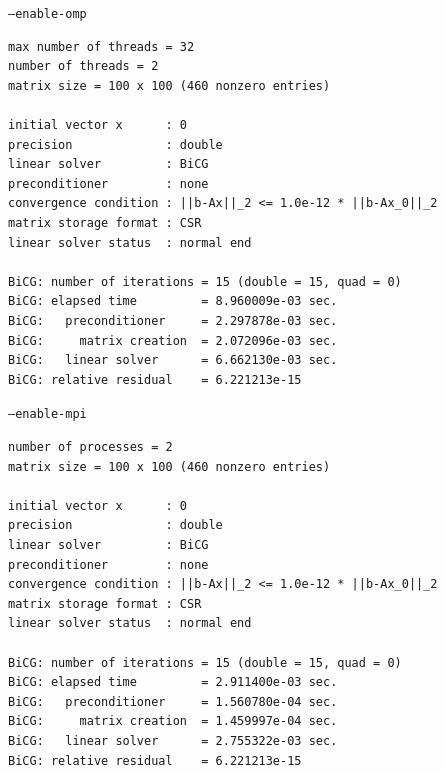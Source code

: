 \documentclass[a4paper]{jarticle}
\begin{document}
{{{{\begin{itembox}[l]
{\begin{minipage}{10cm}
\begin{verbatim}
initial vector x      : 0
precision             : double
linear solver         : BiCG
preconditioner        : none
convergence condition : ||b-Ax||_2 <= 1.0e-12 * ||b-Ax_0||_2
matrix storage format : CSR
linear solver status  : normal end

BiCG: number of iterations = 15 (double = 15, quad = 0)
BiCG: elapsed time         = 5.178690e-03 sec.
BiCG:   preconditioner     = 1.277685e-03 sec.
BiCG:     matrix creation  = 1.254797e-03 sec.
BiCG:   linear solver      = 3.901005e-03 sec.
BiCG: relative residual    = 6.327297e-15
\end{verbatim}
\end{minipage}
\end{itembox}
\begin{itembox}[l]{{\tt --enable-omp}}
 \begin{minipage}{10cm}
 \begin{verbatim}
max number of threads = 32
number of threads = 2
matrix size = 100 x 100 (460 nonzero entries)

initial vector x      : 0
precision             : double
linear solver         : BiCG
preconditioner        : none
convergence condition : ||b-Ax||_2 <= 1.0e-12 * ||b-Ax_0||_2
matrix storage format : CSR
linear solver status  : normal end

BiCG: number of iterations = 15 (double = 15, quad = 0)
BiCG: elapsed time         = 8.960009e-03 sec.
BiCG:   preconditioner     = 2.297878e-03 sec.
BiCG:     matrix creation  = 2.072096e-03 sec.
BiCG:   linear solver      = 6.662130e-03 sec.
BiCG: relative residual    = 6.221213e-15
\end{verbatim}
\end{minipage}
\end{itembox}
\begin{itembox}[l]{\tt --enable-mpi}
 \begin{minipage}{10cm}
 \begin{verbatim}
number of processes = 2
matrix size = 100 x 100 (460 nonzero entries)

initial vector x      : 0
precision             : double
linear solver         : BiCG
preconditioner        : none
convergence condition : ||b-Ax||_2 <= 1.0e-12 * ||b-Ax_0||_2
matrix storage format : CSR
linear solver status  : normal end

BiCG: number of iterations = 15 (double = 15, quad = 0)
BiCG: elapsed time         = 2.911400e-03 sec.
BiCG:   preconditioner     = 1.560780e-04 sec.
BiCG:     matrix creation  = 1.459997e-04 sec.
BiCG:   linear solver      = 2.755322e-03 sec.
BiCG: relative residual    = 6.221213e-15
\end{verbatim}
\end{minipage}
\end{itembox}

}}}}
\end{document}
